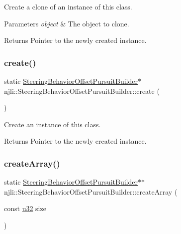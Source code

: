 Create a clone of an instance of this class.


\begin{DoxyParams}{Parameters}
{\em object} & The object to clone.\\
\hline
\end{DoxyParams}
\begin{DoxyReturn}{Returns}
Pointer to the newly created instance. 
\end{DoxyReturn}
\mbox{\label{classnjli_1_1_steering_behavior_offset_pursuit_builder_abe51855a818a72218385ae592ca05a80}} 
\subsubsection{\texorpdfstring{create()}{create()}}
{\footnotesize\ttfamily static \mbox{\hyperlink{classnjli_1_1_steering_behavior_offset_pursuit_builder}{Steering\+Behavior\+Offset\+Pursuit\+Builder}}$\ast$ njli\+::\+Steering\+Behavior\+Offset\+Pursuit\+Builder\+::create (\begin{DoxyParamCaption}{ }\end{DoxyParamCaption})\hspace{0.3cm}{\ttfamily [static]}}

Create an instance of this class.

\begin{DoxyReturn}{Returns}
Pointer to the newly created instance. 
\end{DoxyReturn}
\mbox{\label{classnjli_1_1_steering_behavior_offset_pursuit_builder_a8d8beab0ad8ff0ef55f0cb3e3904d97c}} 
\subsubsection{\texorpdfstring{create\+Array()}{createArray()}}
{\footnotesize\ttfamily static \mbox{\hyperlink{classnjli_1_1_steering_behavior_offset_pursuit_builder}{Steering\+Behavior\+Offset\+Pursuit\+Builder}}$\ast$$\ast$ njli\+::\+Steering\+Behavior\+Offset\+Pursuit\+Builder\+::create\+Array (\begin{DoxyParamCaption}\item[{const \mbox{\hyperlink{_util_8h_a10e94b422ef0c20dcdec20d31a1f5049}{u32}}}]{size }\end{DoxyParamCaption})\hspace{0.3cm}{\ttfamily [static]}}

